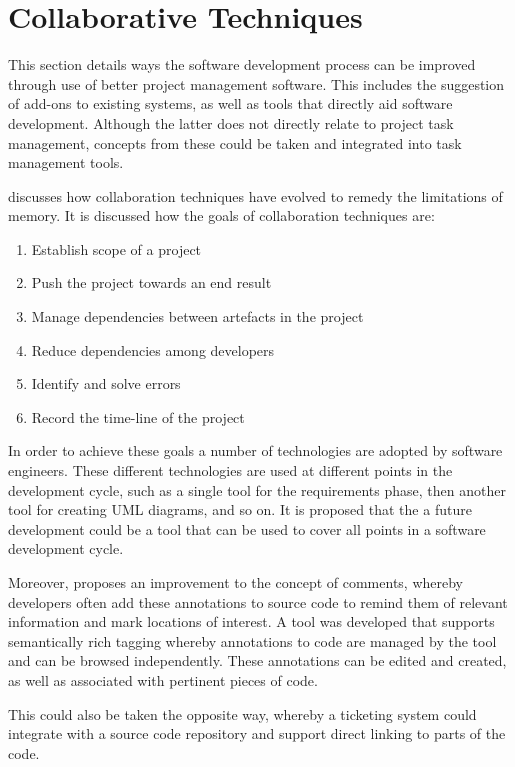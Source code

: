 \documentclass{l4proj}
\begin{document}
\section {Collaborative Techniques}

This section details ways the software development process can be improved through use of better project management software.  This includes the suggestion of add-ons to existing systems, as well as tools that directly aid software development. Although the latter does not directly relate to project task management, concepts from these could be taken and integrated into task management tools.

\citet{whitehead07collaboration} discusses how collaboration techniques have evolved to remedy the limitations of memory. It is discussed how the goals of collaboration techniques are:

\begin {enumerate}
\item Establish scope of a project
\item Push the project towards an end result
\item Manage dependencies between artefacts in the project
\item Reduce dependencies among developers
\item Identify and solve errors
\item Record the time-line of the project
\end {enumerate}

In order to achieve these goals a number of technologies are adopted by software engineers.  These different technologies are used at different points in the development cycle, such as a single tool for the requirements phase, then another tool for creating UML diagrams, and so on.  It is proposed that the a future development could be a tool that can be used to cover all points in a software development cycle.

Moreover, \citet{storey09software} proposes an improvement to the concept of comments, whereby developers often add these annotations to source code to remind them of relevant information and mark locations of interest.  A tool was developed that supports semantically rich tagging whereby annotations to code are managed by the tool and can be browsed independently.  These annotations can be edited and created, as well as associated with pertinent pieces of code.  

This could also be taken the opposite way, whereby a ticketing system could integrate with a source code repository and support direct linking to parts of the code.
\end{document}
